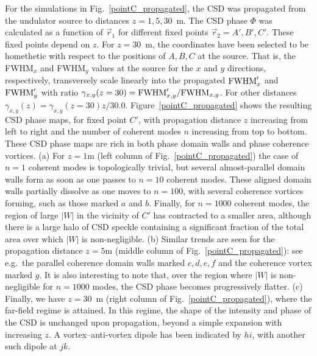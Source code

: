 \documentclass[%
 reprint,
 amsmath,amssymb,
 aps,
]{revtex4-1}
\begin{document}
For the simulations in Fig.~\ref{pointC_propagated}, the CSD was propagated from the undulator source to distances $z=1,5,30$~m. The CSD phase $\Phi$ was calculated as a function of $\vec{r}_1$ for different fixed points $\vec{r}_2=A',B',C'$. These fixed points depend on $z$. For $z=30$~m, the coordinates have been selected to be homethetic with respect to the positions of $A, B, C$ at the source. That is, the FWHM$_x$ and FWHM$_y$ values at the source for the $x$ and $y$ directions, respectively, transversely scale linearly into the propagated ${\rm FWHM}'_x$ and ${\rm FWHM}'_y$ with ratio $\gamma_{x,y}(z=30)={\rm FWHM}'_{x,y}/{\rm FWHM}_{x,y}$.
For other distances $\gamma_{x,y}(z)= \gamma_{x,y}(z=30) z / 30.0$. Figure~\ref{pointC_propagated} shows the resulting CSD phase maps, for fixed point $C'$, with propagation distance $z$ increasing from left to right and the number of coherent modes $n$ increasing from top to bottom. These CSD phase maps are rich in both phase domain walls and phase coherence vortices.  (a) For $z=1$m (left column of Fig.~\ref{pointC_propagated}) the case of $n=1$ coherent modes is topologically trivial, but several almost-parallel domain walls form as soon as one passes to $n=10$ coherent modes.  These aligned domain walls partially dissolve as one moves to $n=100$, with several coherence vortices forming, such as those marked $a$ and $b$.  Finally, for $n=1000$ coherent modes, the region of large $|W|$ in the vicinity of $C'$ has contracted to a smaller area, although there is a large halo of CSD speckle containing a significant fraction of the total area over which $|W|$ is non-negligible. (b) Similar trends are seen for the propagation distance $z=5$m (middle column of Fig.~\ref{pointC_propagated}): see e.g.~the parallel coherence domain walls marked $c,d,e,f$ and the coherence vortex marked $g$.  It is also interesting to note that, over the region where $|W|$ is non-negligible for $n=1000$ modes, the CSD phase becomes progressively flatter.  (c) Finally, we have $z=30$~m (right column of Fig.~\ref{pointC_propagated}), where the far-field regime is attained. In this regime, the shape of the intensity and phase of the CSD is unchanged upon propagation, beyond a simple expansion with increasing $z$. A  vortex--anti-vortex dipole has been indicated by $hi$, with another such dipole at $jk$. %
\end{document}
